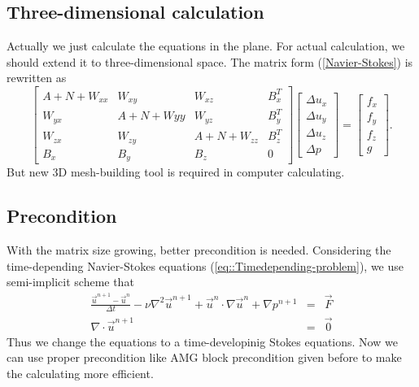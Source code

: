 \documentclass[a4paper]{article}
\begin{document}
\subsection{Three-dimensional calculation}
Actually we just calculate the equations in the plane. For actual calculation, we should extend it to three-dimensional space. The matrix form (\ref{Navier-Stokes}) is rewritten as
\begin{equation}
\left[ \begin{array}{cccc}
A + N +W_{xx} & W_{xy} & W_{xz} & B_x^T \\
W_{yx} & A +N +W{yy}& W_{yz} & B_y^T \\
W_{zx} & W_{zy}  &A + N + W_{zz} & B_z^T \\
B_x & B_y &B_z& 0
\end{array}
\right]
\left[\begin{array}{cccc}
\Delta u_x\\
\Delta u_y\\
\Delta u_z\\
\Delta p
\end{array}
\right]=
\left[\begin{array}{cccc}
f_x\\
f_y\\
f_z\\
g
\end{array}
\right].
\label{3D-Navier-Stokes}
\end{equation}
But new 3D mesh-building tool is required in computer calculating.
\subsection{Precondition}
With the matrix size growing, better precondition is needed. Considering the time-depending Navier-Stokes equations (\ref{eq::Timedepending-problem}), we use semi-implicit scheme that
\begin{equation}
\begin{array}{rcl}
\frac{\vec{u}^{n+1}-\vec{u}^n}{\Delta t} - \nu \nabla^2 \vec{u}^{n+1} + \vec{u}^{n}\cdot \nabla \vec{u}^n + \nabla p^{n+1} &=& \vec{F} \\
\nabla \cdot \vec{u}^{n+1} &=& \vec{0}
\label{eq::implicit and explicit}
\end{array}
\end{equation}
Thus we change the equations to a time-developinig Stokes equations. Now we can use proper precondition like AMG block precondition given before to make the calculating more efficient.



\end{document}
